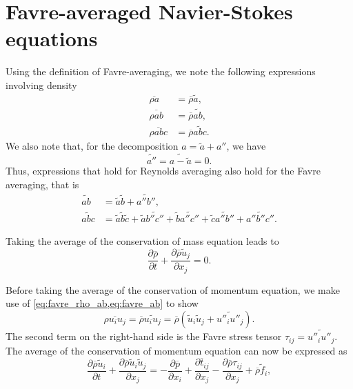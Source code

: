 \documentclass[oneside,a4paper,11pt]{report}
\newcommand{\rhoavg}{\overline{\rho}}
\newcommand{\pavg}{\overline{p}}
\newcommand{\tavg}{\overline{t}}
\newcommand{\rs}{\tau}          %
\newcommand{\aavgf}{\widetilde{a}}
\newcommand{\bavgf}{\widetilde{b}}
\newcommand{\cavgf}{\widetilde{c}}
\newcommand{\favgf}{\widetilde{f}}
\newcommand{\uavgf}{\widetilde{u}}
\newcommand{\aflucf}{a''}
\newcommand{\bflucf}{b''}
\newcommand{\cflucf}{c''}
\newcommand{\uflucf}{u''}
\begin{document}
\section{Favre-averaged Navier-Stokes equations}
Using the definition of Favre-averaging, we note the following expressions involving density 
\begin{align}
    \overline{\rho a} & = \rhoavg \widetilde{a} \label{eq:favre_rho_a} , \\
    \overline{\rho ab} & = \rhoavg \widetilde{ab} \label{eq:favre_rho_ab} , \\
    \overline{\rho abc} & = \rhoavg \widetilde{abc} \label{eq:favre_rho_abc} .
\end{align}
We also note that, for the decomposition $a = \aavgf + \aflucf$, we have
\begin{equation}
    \widetilde{\aflucf} = \widetilde{a - \aavgf} = 0.
\end{equation}
Thus, expressions that hold for Reynolds averaging also hold for the Favre averaging, that is
\begin{align}
    \widetilde{ab} &= \aavgf \bavgf + \widetilde{a''b''} \label{eq:favre_ab}, \\
    \widetilde{abc} & = \aavgf \bavgf \cavgf + \aavgf \widetilde{\bflucf \cflucf} + \bavgf \widetilde{\aflucf \cflucf} + \cavgf \widetilde{\aflucf \bflucf} + \widetilde{\aflucf \bflucf \cflucf}. \label{eq:favre_abc}
\end{align}

Taking the average of the conservation of mass equation leads to
\begin{equation}
\frac{\partial \rhoavg}{\partial t} + \frac{\partial \rhoavg \uavgf_j}{\partial x_j} = 0.
\end{equation}

Before taking the average of the conservation of momentum equation, we make use of \cref{eq:favre_rho_ab,eq:favre_ab} to show
\begin{equation}
\label{eq:mom_flux_expansion}
    \overline{\rho u_i u_j} = \rhoavg \widetilde{u_i u_j} = \rhoavg \left ( \uavgf_i \uavgf_j + \widetilde{\uflucf_i \uflucf_j} \right).
\end{equation}
The second term on the right-hand side is the Favre stress tensor $\rs_{ij} = \widetilde{\uflucf_i \uflucf_j}$. The average of the conservation of momentum equation can now be expressed as 
\begin{equation}
\frac{\partial \rhoavg \uavgf_i}{\partial t} + \frac{\partial \rhoavg \uavgf_i \uavgf_j}{\partial x_j} = -\frac{\partial \pavg}{\partial x_i} + \frac{\partial \tavg_{ij}}{\partial x_j} - \frac{\partial \rhoavg \rs_{ij} }{\partial x_j} + \rhoavg \favgf_i,
\end{equation}
\end{document}
